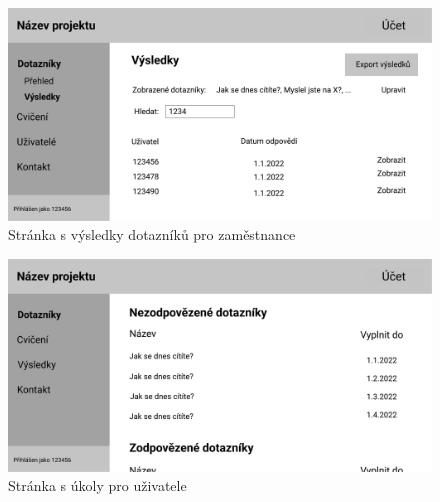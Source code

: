 \documentclass[12pt,a4paper]{report}
\let\openright=\clearpage
\begin{document}
    \begin{figure}[H]
        \centering
        \includegraphics[width=\textwidth]{../attachments/design/zamestnanec/dotazniky-vysledky}
        \caption{Stránka s výsledky dotazníků pro zaměstnance}\label{fig:vysledky-zamestnanec}
    \end{figure}

    \begin{figure}[H]
        \centering
        \includegraphics[width=\textwidth]{../attachments/design/uzivatel/ukoly-prehled}
        \caption{Stránka s úkoly pro uživatele}\label{fig:ukoly-prehled}
    \end{figure}

    \openright
\end{document}
